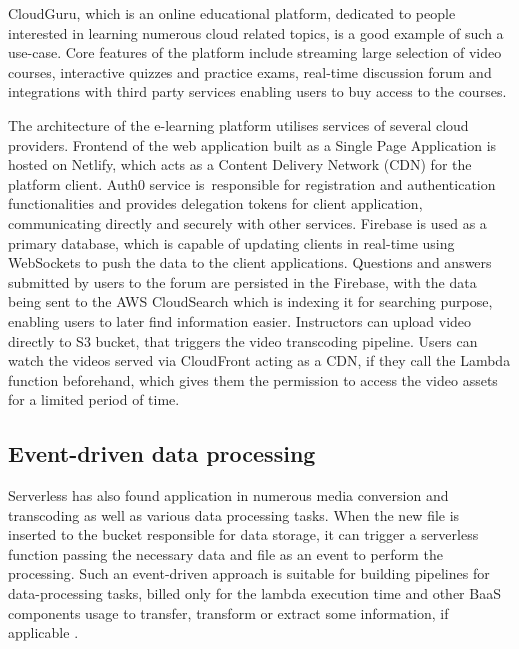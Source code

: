 CloudGuru, which is an online educational platform, dedicated to people interested in learning numerous cloud related topics, is a good example of such a use-case. Core features of the platform include streaming large selection of video courses, interactive quizzes and practice exams, real-time discussion forum and integrations with third party services enabling users to buy access to the courses.

The architecture of the e-learning platform utilises services of several cloud providers. Frontend of the web application built as a Single Page Application is hosted on Netlify, which acts as a Content Delivery Network (CDN) for the platform client. Auth0 service is~responsible for registration and authentication functionalities and provides delegation tokens for client application, communicating directly and securely with other services. Firebase is used as a primary database, which is capable of updating clients in real-time using WebSockets to push the data to the client applications. Questions and answers submitted by users to the forum are persisted in the Firebase, with the data being sent to the AWS CloudSearch which is indexing it for searching purpose, enabling users to later find information easier. Instructors can upload video directly to S3 bucket, that triggers the video transcoding pipeline. Users can watch the videos served via CloudFront acting as a CDN, if they call the Lambda function beforehand, which gives them the permission to access the video assets for a limited period of time.

\subsection{Event-driven data processing} \label{chapter:serverless-example-event-drive-processing}


Serverless has also found application in numerous media conversion and transcoding as well as various data processing tasks. When the new file is inserted to the bucket responsible for data storage, it can trigger a serverless function passing the necessary data and file as an event to perform the processing. Such an event-driven approach is suitable for building pipelines for data-processing tasks, billed only for the lambda execution time and other BaaS components usage to transfer, transform or extract some information, if applicable \cite{ServerlessArchitectureOnAWS}.

